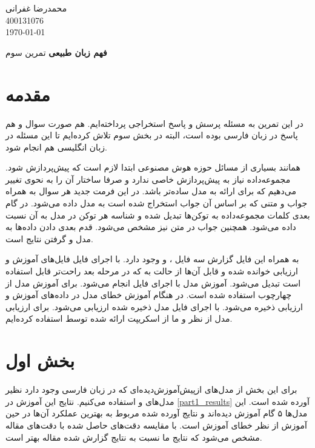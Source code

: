 \documentclass[12pt, a4paper]{book}
\newcommand{\coursetitle}{فهم زبان طبیعی}
\newcommand{\doctitle}{تمرین سوم}
\newcommand{\name}{محمدرضا غفرانی}
\newcommand{\studentno}{400131076}
\newcommand{\todaydate}{\today}
\begin{document}
\begin{flushleft}
    \name \\
    \studentno \\
    \todaydate
\end{flushleft}

\begin{center}
    \huge
    \textbf{\coursetitle}
    \break
    \large
    \doctitle
\end{center}

\thispagestyle{plain}

\section*{مقدمه}

در این تمرین به مسئله پرسش و پاسخ استخراجی پرداخته‌ایم. هم صورت سوال و هم پاسخ در زبان فارسی بوده است،
البته در بخش سوم تلاش کرده‌ایم تا این مسئله در زبان انگلیسی هم انجام شود.

همانند بسیاری از مسائل حوزه هوش مصنوعی ابتدا لازم است که پیش‌پردازش شود. مجموعه‌داده 
نیاز به پیش‌پردازش خاصی ندارد و صرفا ساختار آن را به نحوی تغییر می‌دهیم که برای ارائه به مدل
ساده‌تر باشد. در این فرمت جدید هر سوال به همراه جواب و متنی که بر اساس آن جواب استخراج شده است
به مدل داده می‌شود. در گام بعدی کلمات مجموعه‌داده به توکن‌ها تبدیل شده و شناسه هر توکن در مدل به آن
نسبت داده می‌شود. همچنین  جواب در متن نیز مشخص می‌شود.
قدم بعدی دادن داده‌ها به مدل و گرفتن نتایج است.

به همراه این فایل گزارش سه فایل ،  و 
وجود دارد. با اجرای فایل  فایل‌های آموزش و ارزیابی خوانده شده
و قابل آن‌ها از حالت  به  که در مرحله بعد راحت‌تر قابل استفاده است تبدیل می‌شود.
آموزش مدل با اجرای فایل  انجام می‌شود. برای آموزش مدل از چهارچوب 
استفاده شده است. در هنگام آموزش خطای مدل در داده‌های آموزش و ارزیابی ذخیره می‌شود. با اجرای فایل
 مدل ذخیره شده ارزیابی می‌شود. برای ارزیابی مدل از نظر  و  ما از
اسکریپت ارائه شده توسط \href{https://huggingface.co/spaces/evaluate-metric/squad_v2}{} استفاده کرده‌ایم.

\section*{بخش اول}

برای این بخش از مدل‌های ازپیش‌آموزش‌دیده‌ای که در زبان فارسی وجود دارد نظیر مدل‌های
 و  استفاده می‌کنیم. نتایج این آموزش در \autoref{part1_results}
آورده شده است. این مدل‌ها ۵ گام آموزش دیده‌اند و نتایج آورده شده مربوط به بهترین عملکرد آن‌ها در
حین آموزش از نظر خطای آموزش است. با مقایسه‌ دقت‌های حاصل شده با دقت‌های مقاله  مشخص می‌شود
که نتایج ما نسبت به نتایج گزارش شده مقاله بهتر است.
\end{document}
